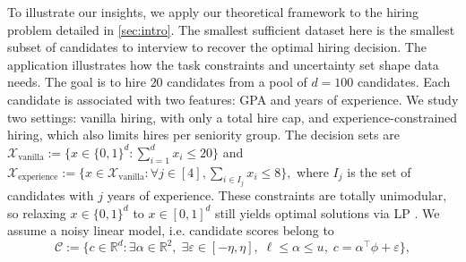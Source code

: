 \documentclass[11pt]{article}
\theoremstyle{plain}
\theoremstyle{definition}
\newcommand{\R}[0]{\mathbb R}
\renewcommand{\dim}[0]{\mathrm{dim}\;}
\newcommand{\dualpoly}[2]{#1^\star\left(#2\right)}
\newcommand{\spc}[1]{\mathrm{dir}\left(#1\right)}
\newcommand{\cX}{\mathcal{X}}
\newcommand{\cC}{\mathcal{C}}
\begin{document}
To illustrate our insights, we apply our theoretical framework to the hiring problem detailed in \cref{sec:intro}.
The smallest sufficient dataset here is the smallest subset of candidates to interview to recover the optimal hiring decision. The application illustrates how the task constraints and uncertainty set shape data needs. 
The goal is to hire $20$ candidates from a pool of $d=100$ candidates. Each candidate is associated with two features: GPA and years of experience.
We study two settings: vanilla hiring, with only a total hire cap, and experience-constrained hiring, which also limits hires per seniority group. The decision sets are 
$\cX_{\text{vanilla}} := \{x \in \{0,1\}^d : \sum_{i=1}^d x_i \leq 20\}$ and $\cX_{\text{experience}} := \{x \in \cX_{\text{vanilla}} : \forall j \in [4], \sum_{i \in I_j} x_i \leq 8\},$ where $I_j$ is the set of candidates with $j$ years of experience. 
These constraints are totally unimodular, so relaxing $x \in \{0,1\}^d$ to $x \in [0,1]^d$ still yields optimal solutions via LP \citep[Chapter 3]{wolsey2020integer}. We assume a noisy linear model, i.e. candidate scores belong to
$$
\cC := \{c \in \mathbb{R}^d : \exists \alpha \in \mathbb{R}^2,\; \exists \varepsilon \in [-\eta, \eta],\; \ell \leq \alpha \leq u,\; c = \alpha^\top\phi  + \varepsilon\},
$$


\end{document}
